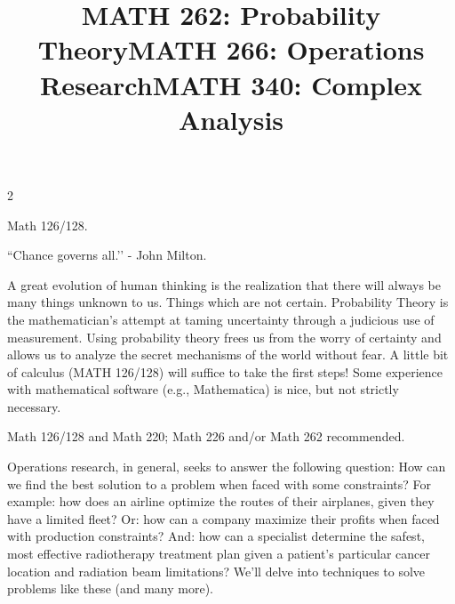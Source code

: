 \documentclass[12pt]{article}
\newcommand{\bolder}{\textbf}
\begin{document}
\begin{multicols}{2}
\begin{tcolorbox}[colback=white, colframe=black]
    \begin{center}
    \title{{\large \bolder{MATH 262: Probability Theory}}}
    \end{center}
\end{tcolorbox}

 Math 126/128.

``Chance governs all.’’ -  John Milton.

A great evolution of human thinking is the realization that there will always be many things unknown to us.  Things which are not certain.  Probability Theory is the mathematician’s attempt at taming uncertainty through a judicious use of measurement.  Using probability theory frees us from the worry of certainty and allows us to analyze the secret mechanisms of the world without fear.   A little bit of calculus (MATH 126/128) will suffice to take the first steps!  Some experience with mathematical software (e.g., Mathematica) is nice, but not strictly necessary.


\begin{tcolorbox}[colback=white, colframe=black]
    \begin{center}
    \title{{\large \bolder{MATH 266: Operations Research}}}
    \end{center}
\end{tcolorbox}

 Math 126/128 and Math 220; Math 226 and/or Math 262 recommended.

Operations research, in general, seeks to answer the following question: How can we find the best solution to a problem when faced with some constraints? For example: how does an airline optimize the routes of their airplanes, given they have a limited fleet? Or: how can a company maximize their profits when faced with production constraints? And: how can a specialist determine the safest, most effective radiotherapy treatment plan given a patient’s particular cancer location and radiation beam limitations?   We’ll delve into techniques to solve problems like these (and many more).


\begin{tcolorbox}[colback=white, colframe=black]
    \begin{center}
    \title{{\large \bolder{MATH 340: Complex Analysis}}}
    \end{center}
\end{tcolorbox}


\end{multicols}
\end{document}
